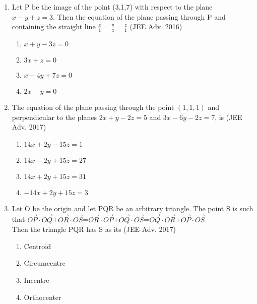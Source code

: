\documentclass[journal,12pt,twocolumn]{IEEEtran}
\theoremstyle{remark}
\begin{document}
\begin{enumerate}[start=41]
         \item %
Let P be the image of the point (3,1,7) with respect to the plane $x-y+z=3$. Then the equation of the plane passing through P and containing the straight line $\frac{x}{1}=\frac{y}{z}=\frac{z}{1}$ \hfill{(JEE Adv. 2016)}\\
\begin{enumerate}
        \item $x+y-3z=0$                             
        \item $3x+z=0$                           
        \item $x-4y+7z=0$            
        \item $2x-y=0$\\          
\end{enumerate}

         \item %
The equation of the plane passing through the point $(1,1,1)$ and perpendicular to the planes $2x+y-2z=5$ and $3x-6y-2z=7$, is \hfill{(JEE Adv. 2017)}\\
\begin{enumerate}
        \item $14x+2y-15z=1$                             
        \item $14x-2y+15z=27$                           
        \item $14x+2y+15z=31$            
        \item $-14x+2y+15z=3$\\          
\end{enumerate}

         \item %
		 Let O be the origin and let PQR be an arbitrary triangle. The point S is such that $\overrightarrow{OP}\cdot\overrightarrow{OQ}$+$\overrightarrow{OR}\cdot\overrightarrow{OS}$=$\overrightarrow{OR}\cdot\overrightarrow{OP}$+$\overrightarrow{OQ}\cdot\overrightarrow{OS}$=$\overrightarrow{OQ}\cdot\overrightarrow{OR}$+$\overrightarrow{OP}\cdot\overrightarrow{OS}$\\
Then the triangle PQR has S as its \hfill{(JEE Adv. 2017)}\\
\begin{enumerate}
        \item Centroid                             
        \item Circumcentre                           
        \item Incentre            
        \item Orthocenter\\          
\end{enumerate}
\end{enumerate}
\end{document}
